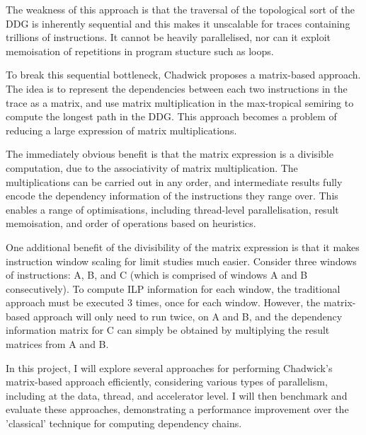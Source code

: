 The weakness of this approach is that the traversal of the topological sort of the DDG is inherently sequential and 
this makes it unscalable for traces containing trillions of instructions. It cannot be heavily parallelised, nor can it 
exploit memoisation of repetitions in program stucture such as loops.


To break this sequential bottleneck, Chadwick proposes a matrix-based approach. The idea is to represent the dependencies 
between each two instructions in the trace as a matrix, and use matrix multiplication in the max-tropical semiring to 
compute the longest path in the DDG. This approach becomes a problem of reducing a large expression of matrix multiplications.

The immediately obvious benefit is that the matrix expression is a divisible computation, due to the associativity of 
matrix multiplication. The multiplications can be carried out in any order, and intermediate results fully encode the
dependency information of the instructions they range over. This enables a range of optimisations, including
thread-level parallelisation, result memoisation, and order of operations based on heuristics.

One additional benefit of the divisibility of the matrix expression is that it makes instruction window scaling for 
limit studies much easier. Consider three windows of instructions: A, B, and C (which is comprised of windows A and B
consecutively). To compute ILP information for each window, the traditional approach must be executed 3 times, once for 
each window. However, the matrix-based approach will only need to run twice, on A and B, and the dependency 
information matrix for C can simply be obtained by multiplying the result matrices from A and B.

In this project, I will explore several approaches for performing Chadwick's matrix-based approach efficiently, 
considering various types of parallelism, including at the data, thread, and accelerator level. I will then benchmark 
and evaluate these approaches, demonstrating a performance improvement over the 'classical' technique for computing 
dependency chains.
